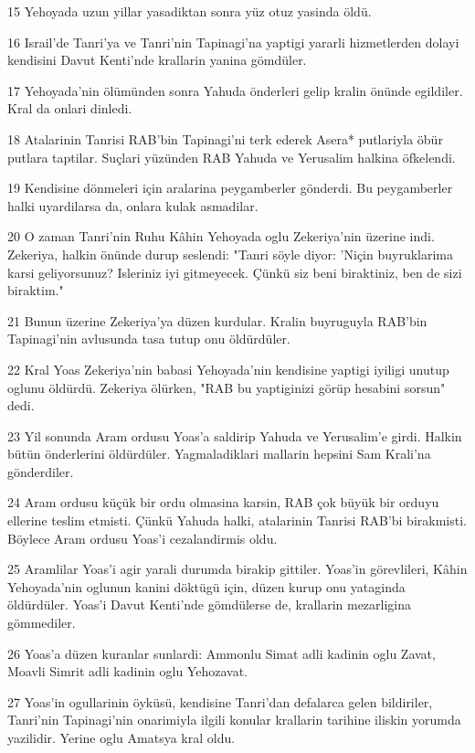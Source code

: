 \par 15 Yehoyada uzun yillar yasadiktan sonra yüz otuz yasinda öldü.
\par 16 Israil'de Tanri'ya ve Tanri'nin Tapinagi'na yaptigi yararli hizmetlerden dolayi kendisini Davut Kenti'nde krallarin yanina gömdüler.
\par 17 Yehoyada'nin ölümünden sonra Yahuda önderleri gelip kralin önünde egildiler. Kral da onlari dinledi.
\par 18 Atalarinin Tanrisi RAB'bin Tapinagi'ni terk ederek Asera* putlariyla öbür putlara taptilar. Suçlari yüzünden RAB Yahuda ve Yerusalim halkina öfkelendi.
\par 19 Kendisine dönmeleri için aralarina peygamberler gönderdi. Bu peygamberler halki uyardilarsa da, onlara kulak asmadilar.
\par 20 O zaman Tanri'nin Ruhu Kâhin Yehoyada oglu Zekeriya'nin üzerine indi. Zekeriya, halkin önünde durup seslendi: "Tanri söyle diyor: 'Niçin buyruklarima karsi geliyorsunuz? Isleriniz iyi gitmeyecek. Çünkü siz beni biraktiniz, ben de sizi biraktim."
\par 21 Bunun üzerine Zekeriya'ya düzen kurdular. Kralin buyruguyla RAB'bin Tapinagi'nin avlusunda tasa tutup onu öldürdüler.
\par 22 Kral Yoas Zekeriya'nin babasi Yehoyada'nin kendisine yaptigi iyiligi unutup oglunu öldürdü. Zekeriya ölürken, "RAB bu yaptiginizi görüp hesabini sorsun" dedi.
\par 23 Yil sonunda Aram ordusu Yoas'a saldirip Yahuda ve Yerusalim'e girdi. Halkin bütün önderlerini öldürdüler. Yagmaladiklari mallarin hepsini Sam Krali'na gönderdiler.
\par 24 Aram ordusu küçük bir ordu olmasina karsin, RAB çok büyük bir orduyu ellerine teslim etmisti. Çünkü Yahuda halki, atalarinin Tanrisi RAB'bi birakmisti. Böylece Aram ordusu Yoas'i cezalandirmis oldu.
\par 25 Aramlilar Yoas'i agir yarali durumda birakip gittiler. Yoas'in görevlileri, Kâhin Yehoyada'nin oglunun kanini döktügü için, düzen kurup onu yataginda öldürdüler. Yoas'i Davut Kenti'nde gömdülerse de, krallarin mezarligina gömmediler.
\par 26 Yoas'a düzen kuranlar sunlardi: Ammonlu Simat adli kadinin oglu Zavat, Moavli Simrit adli kadinin oglu Yehozavat.
\par 27 Yoas'in ogullarinin öyküsü, kendisine Tanri'dan defalarca gelen bildiriler, Tanri'nin Tapinagi'nin onarimiyla ilgili konular krallarin tarihine iliskin yorumda yazilidir. Yerine oglu Amatsya kral oldu.

